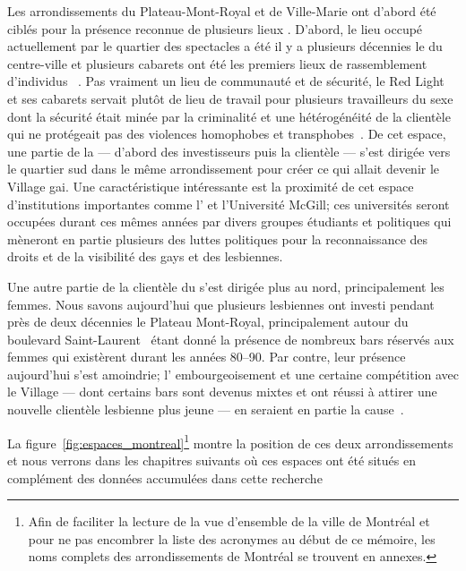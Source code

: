 Les arrondissements du Plateau-Mont-Royal et de Ville-Marie ont d'abord été ciblés pour la présence reconnue de plusieurs lieux \qus{}. 
D'abord, le lieu occupé actuellement par le quartier des spectacles a été il y a plusieurs décennies le  du centre-ville et plusieurs cabarets ont été les premiers lieux de rassemblement d'individus \lgbt{}~\citep[198]{Podmore2015}.
Pas vraiment un lieu de communauté et de sécurité, le Red Light et ses cabarets servait plutôt de lieu de travail pour plusieurs travailleurs du sexe dont la sécurité était minée par la criminalité et une hétérogénéité de la clientèle qui ne protégeait pas des violences homophobes et transphobes~\parencite[91]{Higgins1999}. 
De cet espace, une partie de la  --- d'abord des investisseurs puis la clientèle --- s'est dirigée vers le quartier sud dans le même arrondissement pour créer ce qui allait devenir le Village gai. 
Une caractéristique intéressante est la proximité de cet espace d'institutions importantes comme l'\uqam{} et l'Université McGill; ces universités seront occupées durant ces mêmes années par divers groupes étudiants et politiques qui mèneront en partie plusieurs des luttes politiques pour la reconnaissance des droits et de la visibilité des gays et des lesbiennes.

Une autre partie de la clientèle \lgbt{} du  s'est dirigée plus au nord, principalement les femmes. 
Nous savons aujourd'hui que plusieurs lesbiennes ont investi pendant près de deux décennies le Plateau Mont-Royal, principalement autour du boulevard Saint-Laurent~\citep[599]{Podmore2006} étant donné la présence de nombreux bars réservés aux femmes qui existèrent durant les années 80--90. 
Par contre, leur présence aujourd'hui s'est amoindrie; l’ embourgeoisement et une certaine compétition avec le Village --- dont certains bars sont devenus mixtes et ont réussi à attirer une nouvelle clientèle lesbienne plus jeune --- en seraient en partie la cause~\citep{Podmore2015}.

La figure~\ref{fig:espaces_montreal}\footnote{Afin de faciliter la lecture de la   vue d'ensemble de la ville de Montréal et pour ne pas encombrer la liste des   acronymes au début de ce mémoire, les noms complets des arrondissements de   Montréal se trouvent en annexes.} montre la position de ces deux arrondissements et nous verrons dans les chapitres suivants où ces espaces ont été situés en complément des données accumulées dans cette recherche 

